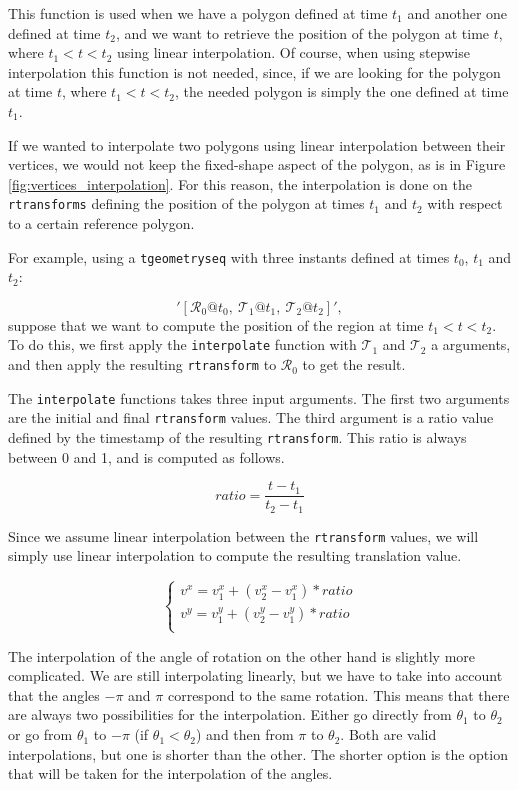 This function is used when we have a polygon defined at time $t_1$ and another one defined at time $t_2$, and we want to retrieve the position of the polygon at time $t$, where $t_1 < t < t_2$ using linear interpolation. Of course, when using stepwise interpolation this function is not needed, since, if we are looking for the polygon at time $t$, where $t_1 < t < t_2$, the needed polygon is simply the one defined at time $t_1$.

If we wanted to interpolate two polygons using linear interpolation between their vertices, we would not keep the fixed-shape aspect of the polygon, as is in Figure \ref{fig:vertices_interpolation}. For this reason, the interpolation is done on the \lstinline{rtransforms} defining the position of the polygon at times $t_1$ and $t_2$ with respect to a certain reference polygon.

For example, using a \lstinline{tgeometryseq} with three instants defined at times $t_0$, $t_1$ and $t_2$: 

\[
    '[\mathcal{R}_0@t_0,\ \mathcal{T}_1@t_1,\ \mathcal{T}_2@t_2]', 
\]
suppose that we want to compute the position of the region at time $t_1 < t < t_2$. To do this, we first apply the \lstinline{interpolate} function with $\mathcal{T}_1$ and $\mathcal{T}_2$ a arguments, and then apply the resulting \lstinline{rtransform} to $\mathcal{R}_0$ to get the result.

The \lstinline{interpolate} functions takes three input arguments. The first two arguments are the initial and final \lstinline{rtransform} values. The third argument is a ratio value defined by the timestamp of the resulting \lstinline+rtransform+. This ratio is always between 0 and 1, and is computed as follows.

\[
    ratio = \frac{t - t_1}{t_2 - t_1}
\]

Since we assume linear interpolation between the \lstinline{rtransform} values, we will simply use linear interpolation to compute the resulting translation value.

\[
    \begin{cases}
        v^x = v_1^x + (v_2^x - v_1^x) * ratio \\
        v^y = v_1^y + (v_2^y - v_1^y) * ratio \\
    \end{cases}
\]

The interpolation of the angle of rotation on the other hand is slightly more complicated. We are still interpolating linearly, but we have to take into account that the angles $-\pi$ and $\pi$ correspond to the same rotation. This means that there are always two possibilities for the interpolation. Either go directly from $\theta_1$ to $\theta_2$ or go from $\theta_1$ to $-\pi$ (if $\theta_1 < \theta_2$) and then from $\pi$ to $\theta_2$. Both are valid interpolations, but one is shorter than the other. The shorter option is the option that will be taken for the interpolation of the angles.

